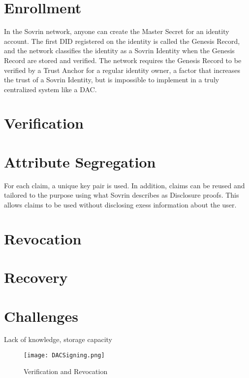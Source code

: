\section{Enrollment}
In the Sovrin network, anyone can create the Master Secret for an identity account. The first DID registered on the identity is called the Genesis Record, and the network classifies the identity as a Sovrin Identity when the Genesis Record are stored and verified. The network requires the Genesis Record to be verified by a Trust Anchor for a regular identity owner, a factor that increases the trust of a Sovrin Identity, but is impossible to implement in a truly centralized system like a DAC.
\section{Verification}

\section{Attribute Segregation}
For each claim, a unique key pair is used. In addition, claims can be reused and tailored to the purpose using what Sovrin describes as Disclosure proofs. This allows claims to be used without disclosing exess information about the user.
\section{Revocation}

\section{Recovery}

\section{Challenges}
Lack of knowledge, storage capacity 
\begin{figure}[ht]
    \centering
    \texttt{[image: DACSigning.png]}
    \caption{Verification and Revocation}
    \label{fig:dac_sign}
\end{figure}
